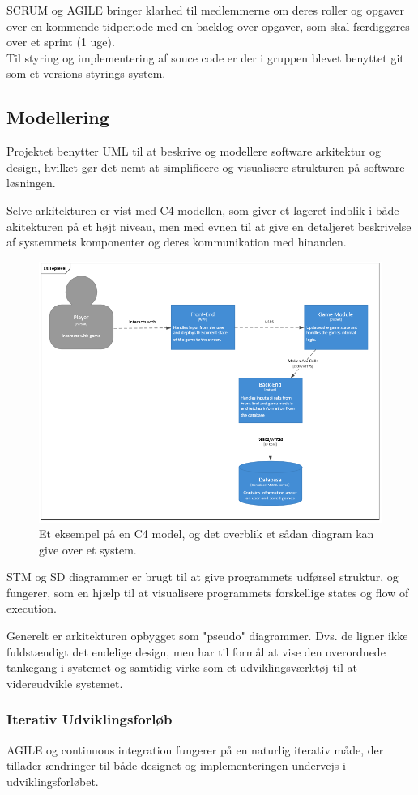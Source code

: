 SCRUM og AGILE bringer klarhed til medlemmerne om deres roller og opgaver over en 
kommende tidperiode med en backlog over opgaver, som skal færdiggøres over et sprint (1 uge).\\
Til styring og implementering af souce code er der i gruppen blevet benyttet git som et versions styrings system.

\subsection{Modellering}
Projektet benytter UML til at beskrive og modellere software arkitektur
og design, hvilket gør det nemt at simplificere og visualisere strukturen på software
løsningen. 

Selve arkitekturen er vist med C4 modellen, som giver et lageret indblik i både
akitekturen på et højt niveau, men med evnen til at give en detaljeret beskrivelse
af systemmets komponenter og deres kommunikation med hinanden.

\begin{figure}[H]
  \centering
  \includegraphics[scale=0.8]{02-Body/Images/C4TopLvlDB.PNG}
  \caption{Et eksempel på en C4 model, og det overblik et sådan diagram kan give over et system.}
  \label{fig:c4}
\end{figure}

STM og SD diagrammer er brugt til at give programmets udførsel struktur, og fungerer,
som en hjælp til at visualisere programmets forskellige states og flow of execution.

Generelt er arkitekturen opbygget som "pseudo" diagrammer. Dvs. de ligner ikke fuldstændigt det endelige design, men har til formål at vise den overordnede tankegang i systemet og samtidig 
virke som et udviklingsværktøj til at videreudvikle systemet.

\subsubsection{Iterativ Udviklingsforløb}

AGILE og continuous integration fungerer på en naturlig iterativ måde, der tillader 
ændringer til både designet og implementeringen undervejs i udviklingsforløbet.\\



